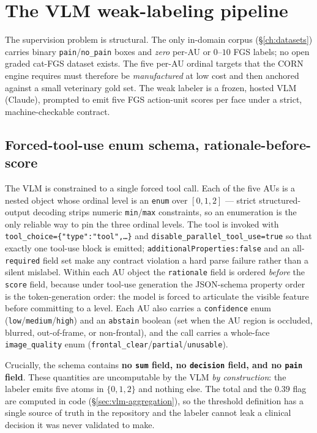 \section{The VLM weak-labeling pipeline}
\label{sec:vlm-pipeline}

The supervision problem is structural. The only in-domain corpus
(\S\ref{ch:datasets}) carries binary \texttt{pain}/\texttt{no\_pain} boxes and
\emph{zero} per-AU or $0$--$10$ FGS labels; no open graded cat-FGS dataset
exists. The five per-AU ordinal targets that the CORN engine requires must
therefore be \emph{manufactured} at low cost and then anchored against a small
veterinary gold set. The weak labeler is a frozen, hosted VLM (Claude),
prompted to emit five FGS action-unit scores per face under a strict,
machine-checkable contract.

\subsection{Forced-tool-use enum schema, rationale-before-score}
\label{sec:vlm-schema}

The VLM is constrained to a single forced tool call. Each of the five AUs is a
nested object whose ordinal level is an \texttt{enum} over $[0,1,2]$ ---
strict structured-output decoding strips numeric \texttt{min}/\texttt{max}
constraints, so an enumeration is the only reliable way to pin the three ordinal
levels. The tool is invoked with
\texttt{tool\_choice=\{"type":"tool",\dots\}} and
\texttt{disable\_parallel\_tool\_use=true} so that exactly one tool-use block is
emitted; \texttt{additionalProperties:false} and an all-\texttt{required} field
set make any contract violation a hard parse failure rather than a silent
mislabel. Within each AU object the \texttt{rationale} field is ordered
\emph{before} the \texttt{score} field, because under tool-use generation the
JSON-schema property order is the token-generation order: the model is forced to
articulate the visible feature before committing to a level. Each AU also
carries a \texttt{confidence} enum (\texttt{low}/\texttt{medium}/\texttt{high})
and an \texttt{abstain} boolean (set when the AU region is occluded, blurred,
out-of-frame, or non-frontal), and the call carries a whole-face
\texttt{image\_quality} enum
(\texttt{frontal\_clear}/\texttt{partial}/\texttt{unusable}).

Crucially, the schema contains \textbf{no \texttt{sum} field, no
\texttt{decision} field, and no \texttt{pain} field}. These quantities are
uncomputable by the VLM \emph{by construction}: the labeler emits five atoms in
$\{0,1,2\}$ and nothing else. The total and the $0.39$ flag are computed in code
(\S\ref{sec:vlm-aggregation}), so the threshold definition has a single source
of truth in the repository and the labeler cannot leak a clinical decision it
was never validated to make.

